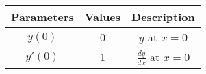 \begin{tabular}{|c|c|c|}
\hline
\textbf{Parameters} & \textbf{Values} & \textbf{Description} \\
\hline
$y(0)$ & 0 & $y$ at $x=0$\\
\hline
$y'(0)$& 1 &$\frac{dy}{dx}$ at $x=0$ \\
\hline
\end{tabular}
